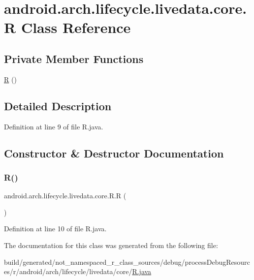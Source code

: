 \hypertarget{classandroid_1_1arch_1_1lifecycle_1_1livedata_1_1core_1_1_r}{}\section{android.\+arch.\+lifecycle.\+livedata.\+core.\+R Class Reference}
\label{classandroid_1_1arch_1_1lifecycle_1_1livedata_1_1core_1_1_r}
\subsection*{Private Member Functions}
\begin{DoxyCompactItemize}
\item 
\mbox{\hyperlink{classandroid_1_1arch_1_1lifecycle_1_1livedata_1_1core_1_1_r_a7fc432c4c258018b64541028c6f7a67b}{R}} ()
\end{DoxyCompactItemize}


\subsection{Detailed Description}


Definition at line 9 of file R.\+java.



\subsection{Constructor \& Destructor Documentation}
\mbox{\label{classandroid_1_1arch_1_1lifecycle_1_1livedata_1_1core_1_1_r_a7fc432c4c258018b64541028c6f7a67b}} 
\subsubsection{\texorpdfstring{R()}{R()}}
{\footnotesize\ttfamily android.\+arch.\+lifecycle.\+livedata.\+core.\+R.\+R (\begin{DoxyParamCaption}{ }\end{DoxyParamCaption})\hspace{0.3cm}{\ttfamily [private]}}



Definition at line 10 of file R.\+java.


\begin{DoxyCode}{0}

\end{DoxyCode}


The documentation for this class was generated from the following file\+:\begin{DoxyCompactItemize}
\item 
build/generated/not\+\_\+namespaced\+\_\+r\+\_\+class\+\_\+sources/debug/process\+Debug\+Resources/r/android/arch/lifecycle/livedata/core/\mbox{\hyperlink{android_2arch_2lifecycle_2livedata_2core_2_r_8java}{R.\+java}}\end{DoxyCompactItemize}
